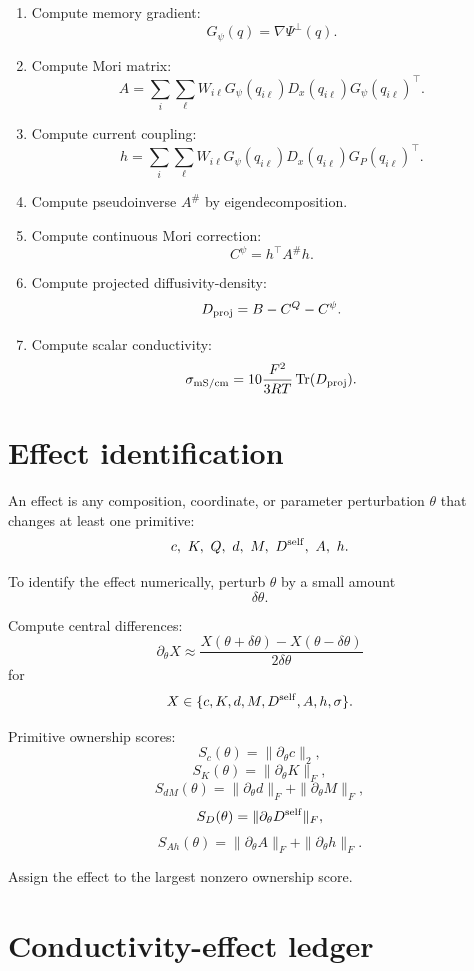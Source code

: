 \documentclass[11pt]{article}
\newcommand{\Tr}{\operatorname{Tr}}
\begin{document}
\begin{enumerate}
\item Compute memory gradient:
\[
G_\psi(q)=\nabla\Psi^\perp(q).
\]

\item Compute Mori matrix:
\[
A=
\sum_i\sum_\ell
W_{i\ell}
G_\psi(q_{i\ell})
D_x(q_{i\ell})
G_\psi(q_{i\ell})^\top.
\]

\item Compute current coupling:
\[
h=
\sum_i\sum_\ell
W_{i\ell}
G_\psi(q_{i\ell})
D_x(q_{i\ell})
G_P(q_{i\ell})^\top.
\]

\item Compute pseudoinverse \(A^\#\) by eigendecomposition.

\item Compute continuous Mori correction:
\[
C^\psi=h^\top A^\#h.
\]

\item Compute projected diffusivity-density:
\[
D_{\rm proj}=B-C^Q-C^\psi.
\]

\item Compute scalar conductivity:
\[
\sigma_{\rm mS/cm}
=
10\frac{F^2}{3RT}\Tr(D_{\rm proj}).
\]

\end{enumerate}

\section{Effect identification}

An effect is any composition, coordinate, or parameter perturbation \(\theta\)
that changes at least one primitive:
\[
c,\ K,\ Q,\ d,\ M,\ D^{\rm self},\ A,\ h.
\]

To identify the effect numerically, perturb \(\theta\) by a small amount
\[
\delta\theta.
\]

Compute central differences:
\[
\partial_\theta X
\approx
\frac{X(\theta+\delta\theta)-X(\theta-\delta\theta)}
{2\delta\theta}
\]
for
\[
X\in
\{c,K,d,M,D^{\rm self},A,h,\sigma\}.
\]

Primitive ownership scores:
\[
S_c(\theta)=\|\partial_\theta c\|_2,
\]
\[
S_K(\theta)=\|\partial_\theta K\|_F,
\]
\[
S_{dM}(\theta)=
\|\partial_\theta d\|_F+\|\partial_\theta M\|_F,
\]
\[
S_{D}(\theta)=\|\partial_\theta D^{\rm self}\|_F,
\]
\[
S_{Ah}(\theta)=\|\partial_\theta A\|_F+\|\partial_\theta h\|_F.
\]

Assign the effect to the largest nonzero ownership score.

\section{Conductivity-effect ledger}
\end{document}
